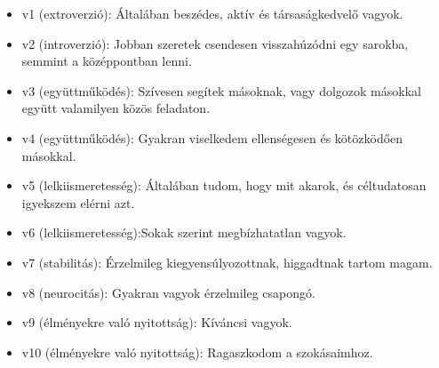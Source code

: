 \documentclass[
  letterpaper,
]{krantz}
\providecommand{\tightlist}{%
  \setlength{\itemsep}{0pt}\setlength{\parskip}{0pt}}\usepackage{longtable,booktabs,array}
\begin{document}
\begin{itemize}
\tightlist
\item
  v1 (extroverzió): Általában beszédes, aktív és társaságkedvelő vagyok.
\item
  v2 (introverzió): Jobban szeretek csendesen visszahúzódni egy sarokba,
  semmint a középpontban lenni.
\item
  v3 (együttműködés): Szívesen segítek másoknak, vagy dolgozok másokkal
  együtt valamilyen közös feladaton.
\item
  v4 (együttműködés): Gyakran viselkedem ellenségesen és kötözködően
  másokkal.
\item
  v5 (lelkiismeretesség): Általában tudom, hogy mit akarok, és
  céltudatosan igyekszem elérni azt.
\item
  v6 (lelkiismeretesség):Sokak szerint megbízhatatlan vagyok.
\item
  v7 (stabilitás): Érzelmileg kiegyensúlyozottnak, higgadtnak tartom
  magam.
\item
  v8 (neurocitás): Gyakran vagyok érzelmileg csapongó.
\item
  v9 (élményekre való nyitottság): Kíváncsi vagyok.
\item
  v10 (élményekre való nyitottság): Ragaszkodom a szokásaimhoz.
\end{itemize}
\end{document}
